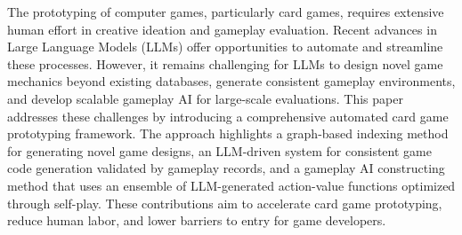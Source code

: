 
The prototyping of computer games, particularly card games, requires extensive human effort in creative ideation and gameplay evaluation. Recent advances in Large Language Models (LLMs) offer opportunities to automate and streamline these processes. However, it remains challenging for LLMs to design novel game mechanics beyond existing databases, generate consistent gameplay environments, and develop scalable gameplay AI for large-scale evaluations.
This paper addresses these challenges by introducing a comprehensive automated card game prototyping framework. 
The approach highlights a graph-based indexing method for generating novel game designs, an LLM-driven system for consistent game code generation validated by gameplay records, and a gameplay AI constructing method that uses an ensemble of LLM-generated action-value functions optimized through self-play. These contributions aim to accelerate card game prototyping, reduce human labor, and lower barriers to entry for game developers.
